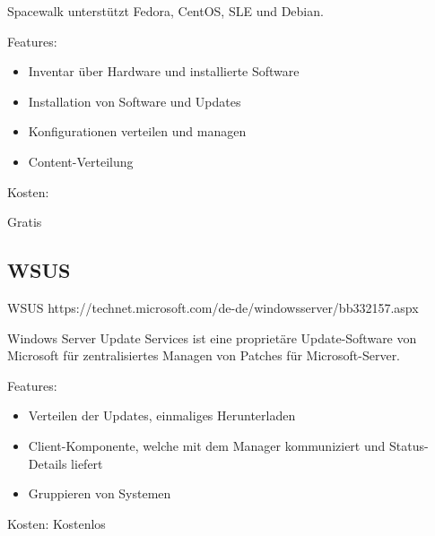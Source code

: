 Spacewalk unterstützt Fedora, CentOS, SLE und Debian.

Features:

\begin{itemize}
\item Inventar über Hardware und installierte Software
\item Installation von Software und Updates
\item Konfigurationen verteilen und managen
\item Content-Verteilung
\end{itemize}

Kosten:

Gratis



\subsection{WSUS}

\gls{WSUS}
https://technet.microsoft.com/de-de/windowsserver/bb332157.aspx

Windows Server Update Services ist eine proprietäre Update-Software von Microsoft für zentralisiertes Managen von Patches für Microsoft-Server.

Features:

\begin{itemize}
\item Verteilen der Updates, einmaliges Herunterladen
\item Client-Komponente, welche mit dem Manager kommuniziert und Status-Details liefert
\item Gruppieren von Systemen
\end{itemize}

Kosten:
Kostenlos
